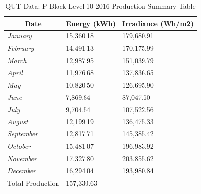 \begin{table}[H]
	\centering
	\begin{tabular}{|l|l|l|}
		\hline
		\multicolumn{1}{|c|}{\textbf{Date}} & \multicolumn{1}{c|}{\textbf{Energy (kWh)}} & \multicolumn{1}{c|}{\textbf{Irradiance (Wh/m2)}} \\ \hline
		\textit{January}                    & 15,360.18                                  & 179,680.91                                       \\ \hline
		\textit{February}                   & 14,491.13                                  & 170,175.99                                       \\ \hline
		\textit{March}                      & 12,987.95                                  & 151,039.79                                       \\ \hline
		\textit{April}                      & 11,976.68                                  & 137,836.65                                       \\ \hline
		\textit{May}                        & 10,820.50                                  & 126,695.90                                       \\ \hline
		\textit{June}                       & 7,869.84                                   & 87,047.60                                        \\ \hline
		\textit{July}                       & 9,704.54                                   & 107,522.56                                       \\ \hline
		\textit{August}                     & 12,199.19                                  & 136,475.33                                       \\ \hline
		\textit{September}                  & 12,817.71                                  & 145,385.42                                       \\ \hline
		\textit{October}                    & 15,481.07                                  & 196,983.92                                       \\ \hline
		\textit{November}                   & 17,327.80                                  & 203,855.62                                       \\ \hline
		\textit{December}                   & 16,294.04                                  & 193,980.84                                       \\ \hline
		Total Production                    & \multicolumn{2}{l|}{157,330.63}                                                               \\ \hline
	\end{tabular}
	\caption{QUT Data: P Block Level 10 2016 Production Summary Table}
	\label{table:qut-pv-lvl10-2016}
\end{table}

